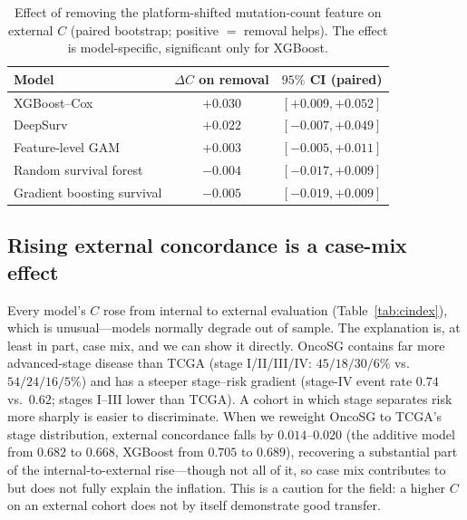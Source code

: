 \documentclass[journal]{IEEEtran}
\begin{document}
\begin{table}[t]
\caption{Effect of removing the platform-shifted mutation-count feature on
external $C$ (paired bootstrap; positive $=$ removal helps). The effect is
model-specific, significant only for XGBoost.}
\label{tab:delta}
\centering
\begin{tabular}{lcc}
\toprule
Model & $\Delta C$ on removal & $95\%$ CI (paired) \\
\midrule
XGBoost--Cox                 & $+0.030$ & $[+0.009,+0.052]$ \\
DeepSurv                     & $+0.022$ & $[-0.007,+0.049]$ \\
Feature-level GAM            & $+0.003$ & $[-0.005,+0.011]$ \\
Random survival forest       & $-0.004$ & $[-0.017,+0.009]$ \\
Gradient boosting survival   & $-0.005$ & $[-0.019,+0.009]$ \\
\bottomrule
\end{tabular}
\end{table}

\subsection{Rising external concordance is a case-mix effect}
Every model's $C$ rose from internal to external evaluation
(Table~\ref{tab:cindex}), which is unusual---models normally degrade out of
sample. The explanation is, at least in part, case mix, and we can show it
directly. OncoSG contains far more advanced-stage disease than TCGA (stage
I/II/III/IV: $45/18/30/6\%$ vs.\ $54/24/16/5\%$) and has a steeper stage--risk
gradient (stage-IV event rate $0.74$ vs.\ $0.62$; stages I--III lower than
TCGA). A cohort in which stage separates risk more sharply is easier to
discriminate. When we reweight OncoSG to TCGA's stage distribution, external
concordance falls by $0.014$--$0.020$ (the additive model from $0.682$ to
$0.668$, XGBoost from $0.705$ to $0.689$), recovering a substantial part of the
internal-to-external rise---though not all of it, so case mix contributes to but
does not fully explain the inflation. This is a caution for the field: a higher $C$ on an external
cohort does not by itself demonstrate good transfer.
\end{document}
